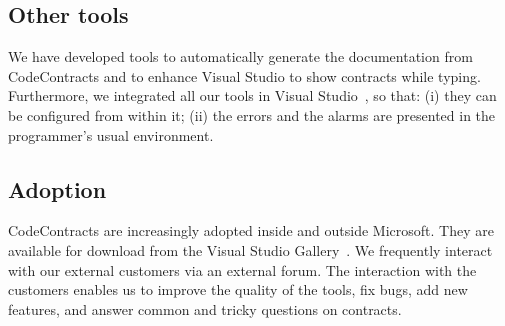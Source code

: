 \documentclass{sig-alternate-2013}
\begin{document}
\subsection{Other tools}
We have developed tools to automatically generate the documentation from CodeContracts and to enhance Visual Studio to show contracts while typing.
Furthermore, we integrated all our  tools in Visual Studio~\cite{vsintegration}, so that: (i) they can be configured from within it; (ii) the errors and the alarms are presented in the programmer's usual environment.

\subsection{Adoption}
CodeContracts are increasingly adopted inside and outside Microsoft.
They are available for download from the Visual Studio Gallery~\cite{downloadCC}.
We frequently interact with our external customers via an external forum.
The interaction with the customers enables us to improve the quality of the tools, fix bugs, add new features, and answer common and tricky questions on contracts.

\vfill\eject 


%
%
\end{document}
